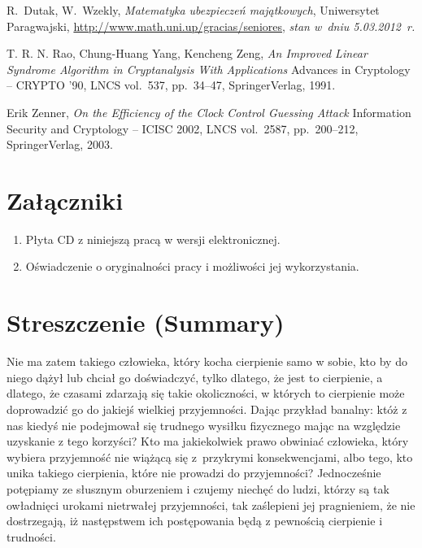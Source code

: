\documentclass[12pt]{mwbk}
\theoremstyle{plain}
\theoremstyle{definition}
\theoremstyle{remark}
\begin{document}
\begin{thebibliography}{99}
R.~Dutak, W.~Wzekly, \emph{Matematyka ubezpieczeń majątkowych},
Uniwersytet Paragwajski,
\url{http://www.math.uni.up/gracias/seniores}, \emph{stan w~dniu
5.03.2012~r.}

T. R. N. Rao, Chung-Huang Yang, Kencheng Zeng, \emph{An Improved
Linear Syndrome Algorithm in Cryptanalysis With Applications} Advances
in Cryptology -- CRYPTO '90, LNCS vol.~537, pp.~34--47,
Springer\dywiz Verlag, 1991.

Erik Zenner, \emph{On the Efficiency of the Clock Control Guessing
Attack} Information Security and Cryptology -- ICISC 2002, LNCS
vol.~2587, pp.~200--212, Springer\dywiz Verlag, 2003.


\end{thebibliography}



\listoffigures

\listoftables


\chapter*{Załączniki}
\begin{enumerate}
\item Płyta CD z niniejszą pracą w wersji elektronicznej.
\item Oświadczenie o oryginalności pracy i możliwości jej wykorzystania. 
\end{enumerate}




\chapter*{Streszczenie (Summary)}



Nie ma zatem takiego człowieka, który kocha cierpienie samo w sobie, 
kto by do niego dążył lub chciał go doświadczyć, tylko dlatego, że
jest to cierpienie, a dlatego, że czasami zdarzają się takie 
okoliczności, w których to cierpienie może doprowadzić 
go do jakiejś wielkiej przyjemności. 
Dając przykład banalny: któż z nas kiedyś nie podejmował 
się trudnego wysiłku fizycznego mając na względzie 
uzyskanie z tego korzyści? 
Kto ma jakiekolwiek prawo obwiniać człowieka, 
który wybiera przyjemność nie wiążącą się z~przykrymi 
konsekwencjami, albo tego, kto unika takiego cierpienia, 
które nie prowadzi do przyjemności? 
Jednocześnie potępiamy ze słusznym oburzeniem i czujemy 
niechęć do ludzi, którzy są tak owładnięci urokami nietrwałej 
przyjemności, tak zaślepieni jej pragnieniem, 
że nie dostrzegają, iż następstwem ich 
postępowania będą z pewnością cierpienie i trudności.
\end{document}
